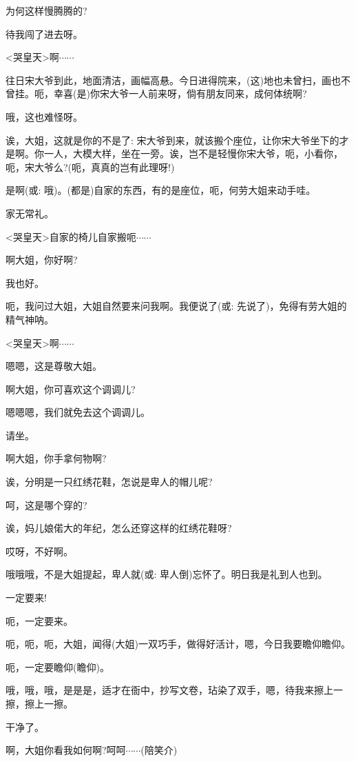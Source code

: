 {为何这样慢腾腾的?}

{待我闯了进去呀。}

{\textless{}哭皇天\textgreater{}啊$\cdots{}\cdots{}$}

{往日宋大爷到此，地面清洁，画幅高悬。今日进得院来，(这)地也未曾扫，画也不曾挂。呃，幸喜(是)你宋大爷一人前来呀，倘有朋友同来，成何体统啊?}

{哦，这也难怪呀。}

{诶，大姐，这就是你的不是了: 宋大爷到来，就该搬个座位，让你宋大爷坐下的才是啊。你一人，大模大样，坐在一旁。诶，岂不是轻慢你宋大爷，呃，小看你，呃，宋大爷么?(呃，真真的岂有此理呀!)}

{是啊({\akai 或}: 哦)。(都是)自家的东西，有的是座位，呃，何劳大姐来动手哇。}

{家无常礼。}

{\textless{}哭皇天\textgreater{}自家的椅儿自家搬呃$\cdots{}\cdots{}$}

{啊大姐，你好啊?}

{我也好。}

{呃，我问过大姐，大姐自然要来问我啊。我便说了({\akai 或}: 先说了)，免得有劳大姐的精气神呐。}

{\textless{}哭皇天\textgreater{}啊$\cdots{}\cdots{}$}

{嗯嗯，这是尊敬大姐。}

{啊}大姐，你可喜欢这个调调儿?

{嗯嗯嗯，我们就免去这个调调儿。}

{请坐。}

{啊大姐，你手拿何物啊?}

{诶，分明是一只红绣花鞋，怎说是卑人的帽儿呢?}

{呵，这是哪个穿的?}

{诶，妈儿娘偌大的年纪，怎么还穿这样的红绣花鞋呀?}

{哎呀，不好啊。}

{哦哦哦，不是大姐提起，卑人就({\akai 或}: 卑人倒)忘怀了。明日我是礼到人也到。}

{一定要来!}

{呃，一定要来。}

{呃，呃，呃，大姐，闻得(大姐)一双巧手，做得好活计，嗯，今日我要瞻仰瞻仰。}

{呃，一定要瞻仰(瞻仰)。}

{哦，哦，哦，是是是，适才在衙中，抄写文卷，玷染了双手，嗯，待我来擦上一擦，擦上一擦。}

{干净了。}

{啊，大姐你看我如何啊?呵呵$\cdots{}\cdots{}$(陪笑介)}

